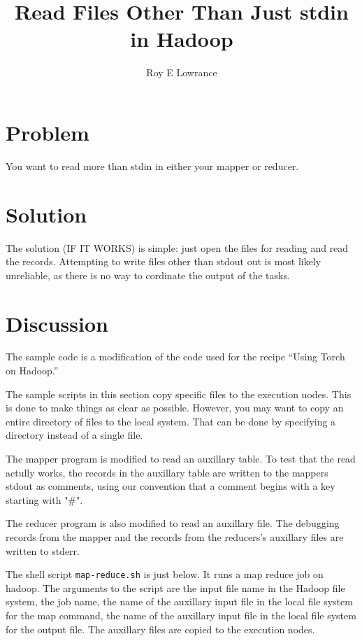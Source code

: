 \documentclass{article}
\let\code\texttt %
\begin{document}
\title{Read Files Other Than Just stdin in Hadoop}
\author{Roy E Lowrance}
\maketitle


\section{Problem}

You want to read more than stdin in either your mapper or reducer.


\section{Solution}

The solution (IF IT WORKS) is simple: just open the files for reading
and read the records. Attempting to write files other than stdout out is
most likely unreliable, as there is no way to cordinate the output of
the tasks.


\section{Discussion}

The sample code is a modification of the code used for the recipe
``Using Torch on Hadoop.''

The sample scripts in this section copy specific files to the
execution nodes. This is done to make things as clear as possible.
However, you may want to copy an entire directory of files to the local
system. That can be done by specifying a directory instead of a single
file.

The mapper program is modified to read an auxillary table. To test that
the read actully works, the records in the auxillary table are written
to the mappers stdout as comments, using our convention that a comment
begins with a key starting with "\#".



The reducer program is also modified to read an auxillary file. The
debugging records from the mapper and the records from the reducers's
auxillary files are written to stderr.



The shell script \code{map-reduce.sh} is
just below. It runs a map reduce job on hadoop. The arguments to the
script are the input file name in the Hadoop file system, the job name,
the name of the auxillary input file in the local file system for the
map command, the name of the auxillary input file in the local file
system for the output file. The auxillary files are copied to the
execution nodes.
\end{document}

